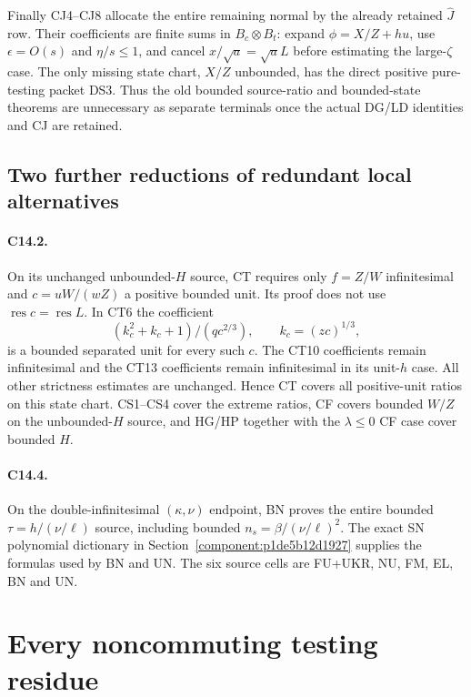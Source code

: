 Finally CJ4--CJ8 allocate the entire remaining normal by the
already retained $\widehat J$ row.  Their coefficients are finite
sums in $B_c\otimes B_t$: expand
$\phi=X/Z+hu$, use $\epsilon=O(s)$ and $\eta/s\le1$, and
cancel $x/\sqrt a=\sqrt a L$ before estimating the large-$\zeta$
case.  The only missing state chart, $X/Z$ unbounded, has the
direct positive pure-testing packet DS3.  Thus the old bounded
source-ratio and bounded-state theorems are unnecessary as separate
terminals once the actual DG/LD identities and CJ are retained.

\subsection{Two further reductions of redundant local alternatives}

\paragraph{C14.2.}
On its unchanged unbounded-$H$ source, CT requires only
$f=Z/W$ infinitesimal and
$c=uW/(wZ)$ a positive bounded unit.  Its proof does not use
$\operatorname{res}c=\operatorname{res}L$.  In CT6 the coefficient
\[
              (k_c^2+k_c+1)/(q c^{2/3}),\qquad k_c=(zc)^{1/3},
\]
is a bounded separated unit for every such $c$.  The CT10
coefficients remain infinitesimal and the CT13 coefficients remain
infinitesimal in its unit-$h$ case.  All other strictness estimates
are unchanged.  Hence CT covers all positive-unit ratios on this
state chart. CS1--CS4 cover the extreme ratios, CF covers bounded
$W/Z$ on the unbounded-$H$ source, and HG/HP together with the
$\lambda\le0$ CF case cover bounded $H$.

\paragraph{C14.4.}
On the double-infinitesimal $(\kappa,\nu)$ endpoint, BN proves
the entire bounded $\tau=h/(\nu/\ell)$ source, including bounded
$n_s=\beta/(\nu/\ell)^2$.  The exact SN polynomial dictionary in Section~\ref{component:p1de5b12d1927} supplies the formulas used by BN and UN.  The
six source cells are FU+UKR, NU, FM, EL, BN and UN.


\section{Every noncommuting testing residue}

